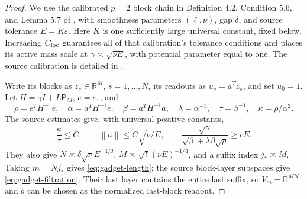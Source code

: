\documentclass[11pt]{article}
\theoremstyle{remark}
\theoremstyle{remark}
\newcommand{\R}{\mathbb R}
\newcommand{\eps}{\varepsilon}
\newcommand{\norm}[1]{\left\lVert#1\right\rVert}
\begin{document}
\begin{proof}
We use the calibrated $p=2$ block chain in Definition 4.2, Condition 5.6, and Lemma 5.7 of \cite{zhou}, with smoothness parameters $(\ell,\nu)$, gap $\delta$, and source tolerance $E=K\eps$. Here $K$ is one sufficiently large universal constant, fixed below. Increasing $C_{\rm loc}$ guarantees all of that calibration's tolerance conditions and places its active mass scale at $\gamma\asymp\sqrt{\nu E}$, with potential parameter equal to one.  The source calibration is detailed in .

Write its blocks as $z_s\in\R^M$, $s=1,\ldots,N$, its readouts as $u_s=a^Tz_s$, and set $u_0=1$. Let $H=\gamma I+L\mathsf P_M$, $e=e_1$, and
\[
 \rho=e^TH^{-1}e,\quad \alpha=a^TH^{-1}e,\quad
 \beta=a^TH^{-1}a,\quad
 \lambda=\alpha^{-1},\quad \tau=\beta^{-1},\quad
 \kappa=\rho/\alpha^2.
\]
The source estimates give, with universal positive constants,
\begin{equation}\label{eq:source-scales}
 \frac{\kappa}{\tau}\le C,\qquad
 \norm a\le C\sqrt{\nu/E},\qquad
 \frac{\sqrt\gamma}{\sqrt\beta+\lambda\beta\sqrt\rho}\ge cE.
\end{equation}
They also give $N\asymp\delta\sqrt\nu E^{-3/2}$, $M\asymp\sqrt\ell(\nu E)^{-1/4}$, and a suffix index $j_*\asymp M$. Taking $m=Nj_*$ gives \eqref{eq:gadget-length}; the source block-layer subspaces give \eqref{eq:gadget-filtration}. Their last layer contains the entire last suffix, so $V_m=\R^{MN}$ and $b$ can be chosen as the normalized last-block readout.


\end{proof}
\end{document}
